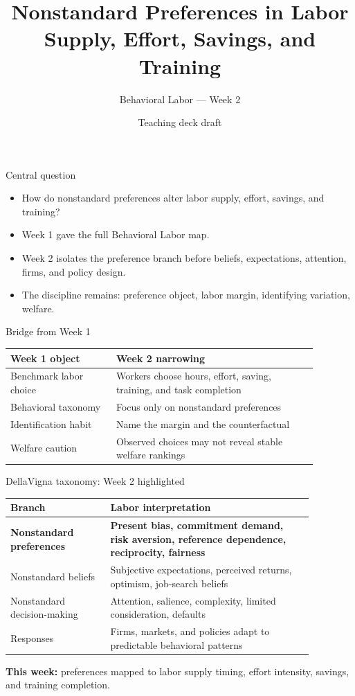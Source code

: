 \documentclass[aspectratio=169,11pt]{beamer}
\title{Nonstandard Preferences in Labor Supply, Effort, Savings, and Training}
\subtitle{Behavioral Labor --- Week 2}
\author{Teaching deck draft}
\date{}
\begin{document}
\begin{frame}
  \titlepage
\end{frame}

\begin{frame}{Central question}
\begin{itemize}
    \item How do nonstandard preferences alter labor supply, effort, savings, and training?
    \item Week 1 gave the full Behavioral Labor map.
    \item Week 2 isolates the preference branch before beliefs, expectations, attention, firms, and policy design.
    \item The discipline remains: preference object, labor margin, identifying variation, welfare.
\end{itemize}
\end{frame}

\begin{frame}{Bridge from Week 1}
\small
\begin{tabular}{p{0.30\linewidth} p{0.58\linewidth}}
\toprule
Week 1 object & Week 2 narrowing \\
\midrule
Benchmark labor choice & Workers choose hours, effort, saving, training, and task completion \\
Behavioral taxonomy & Focus only on nonstandard preferences \\
Identification habit & Name the margin and the counterfactual \\
Welfare caution & Observed choices may not reveal stable welfare rankings \\
\bottomrule
\end{tabular}
\end{frame}

\begin{frame}{DellaVigna taxonomy: Week 2 highlighted}
\small
\begin{tabular}{p{0.29\linewidth} p{0.58\linewidth}}
\toprule
Branch & Labor interpretation \\
\midrule
\textbf{Nonstandard preferences} & \textbf{Present bias, commitment demand, risk aversion, reference dependence, reciprocity, fairness} \\
Nonstandard beliefs & Subjective expectations, perceived returns, optimism, job-search beliefs \\
Nonstandard decision-making & Attention, salience, complexity, limited consideration, defaults \\
Responses & Firms, markets, and policies adapt to predictable behavioral patterns \\
\bottomrule
\end{tabular}

\vspace{0.5em}
\textbf{This week:} preferences mapped to labor supply timing, effort intensity, savings, and training completion.
\end{frame}
\end{document}
